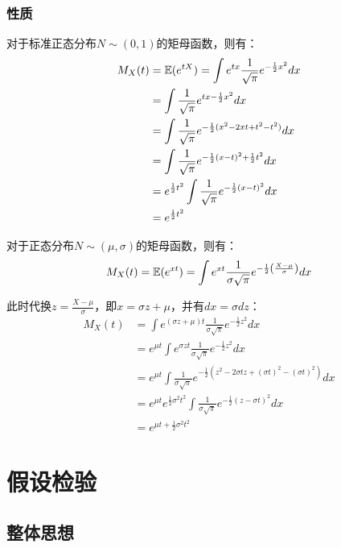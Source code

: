 \documentclass[11pt]{article}
\begin{document}
\subsubsection{性质}

对于标准正态分布$N\sim(0,1)$的矩母函数，则有：
\begin{align*}
    M_X(t) &= \mathbb{E} (e^{tX}) = \int e^{tx} \frac{1}{\sqrt{\pi}} e^{-\frac{1}{2}x^2}dx \\
    &= \int \frac{1}{\sqrt{\pi}} e^{tx-\frac{1}{2}x^2}dx \\
    &= \int \frac{1}{\sqrt{\pi}} e^{-\frac{1}{2} (x^2 -2xt + t^2 -t^2)}dx \\
    &= \int \frac{1}{\sqrt{\pi}} e^{-\frac{1}{2} (x-t)^2 + \frac{1}{2}t^2}dx \\
    &= e^{\frac{1}{2} t^2} \int \frac{1}{\sqrt{\pi}} e^{-\frac{1}{2} (x-t)^2 }dx \\
    &= e^{\frac{1}{2} t^2}
\end{align*}

对于正态分布$N\sim(\mu,\sigma)$的矩母函数，则有：
\begin{equation*}
    M_X(t) = \mathbb{E} (e^{xt}) = \int e^{xt} \frac{1}{\sigma\sqrt{\pi}} e^{-\frac{1}{2} \left( \frac{X-\mu}{\sigma} \right)} dx
\end{equation*}

此时代换$z=\frac{X-\mu}{\sigma}$，即$x= \sigma z + \mu$，并有$dx=\sigma dz$：
\begin{align*}
    M_X(t) &= \int e^{(\sigma z + \mu)t} \frac{1}{\sigma\sqrt{\pi}} e^{-\frac{1}{2}z^2}dx \\
    &= e^{\mu t} \int e^{\sigma z t} \frac{1}{\sigma\sqrt{\pi}} e^{-\frac{1}{2}z^2}dx \\
    &= e^{\mu t} \int \frac{1}{\sigma\sqrt{\pi}} e^{-\frac{1}{2} (z^2 -2\sigma t z + (\sigma t)^2 -(\sigma t)^2)}dx \\
    &= e^{\mu t} e^{\frac{1}{2} \sigma^2 t^2} \int \frac{1}{\sigma\sqrt{\pi}} e^{-\frac{1}{2} (z - \sigma t)^2}dx \\
    &= e^{\mu t + \frac{1}{2} \sigma^2 t^2}
\end{align*}

\section{假设检验}

\subsection{整体思想}
\end{document}
